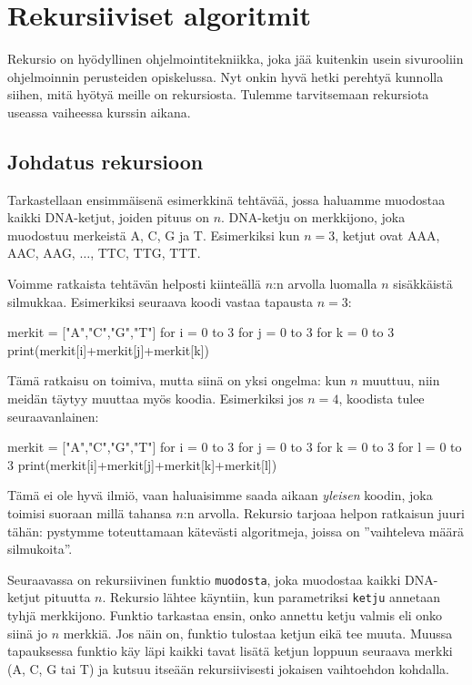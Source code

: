 \section{Rekursiiviset algoritmit}

Rekursio on hyödyllinen ohjelmointitekniikka,
joka jää kuitenkin usein sivurooliin ohjelmoinnin perusteiden opiskelussa.
Nyt onkin hyvä hetki perehtyä kunnolla siihen,
mitä hyötyä meille on rekursiosta.
Tulemme tarvitsemaan rekursiota useassa vaiheessa kurssin aikana.

\subsection{Johdatus rekursioon}

Tarkastellaan ensimmäisenä esimerkkinä tehtävää,
jossa haluamme muodostaa kaikki DNA-ketjut,
joiden pituus on $n$.
DNA-ketju on merkkijono, joka muodostuu merkeistä A, C, G ja T.
Esimerkiksi kun $n=3$, ketjut ovat AAA, AAC, AAG, $\dots$, TTC, TTG, TTT.

Voimme ratkaista tehtävän helposti kiinteällä $n$:n arvolla
luomalla $n$ sisäk\-käistä silmukkaa.
Esimerkiksi seuraava koodi vastaa tapausta $n=3$:

\begin{code}
merkit = ["A","C","G","T"]
for i = 0 to 3
    for j = 0 to 3
        for k = 0 to 3
            print(merkit[i]+merkit[j]+merkit[k])
\end{code}

Tämä ratkaisu on toimiva, mutta siinä on yksi ongelma:
kun $n$ muuttuu, niin meidän täytyy muuttaa myös koodia.
Esimerkiksi jos $n=4$, koodista tulee seuraavanlainen:

\begin{code}
merkit = ["A","C","G","T"]
for i = 0 to 3
    for j = 0 to 3
        for k = 0 to 3
            for l = 0 to 3
                print(merkit[i]+merkit[j]+merkit[k]+merkit[l])
\end{code}

Tämä ei ole hyvä ilmiö, vaan haluaisimme saada aikaan \emph{yleisen}
koodin, joka toimisi suoraan millä tahansa $n$:n arvolla.
Rekursio tarjoaa helpon ratkaisun juuri tähän:
pystymme toteuttamaan kätevästi algoritmeja, joissa on
''vaihteleva määrä silmukoita''.

Seuraavassa on rekursiivinen funktio \texttt{muodosta},
joka muodostaa kaikki DNA-ketjut pituutta $n$.
Rekursio lähtee käyntiin, kun parametriksi \texttt{ketju}
annetaan tyhjä merkkijono.
Funktio tarkastaa ensin, onko annettu ketju valmis
eli onko siinä jo $n$ merkkiä.
Jos näin on, funktio tulostaa ketjun eikä tee muuta.
Muussa tapauksessa funktio käy läpi kaikki tavat
lisätä ketjun loppuun seuraava merkki (A, C, G tai T)
ja kutsuu itseään rekursiivisesti jokaisen vaihtoehdon kohdalla.

